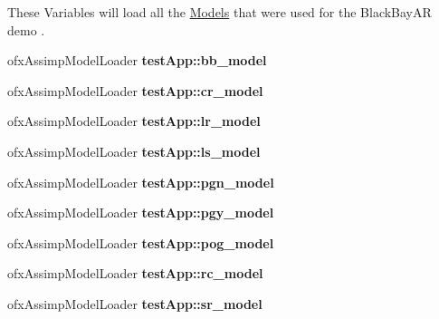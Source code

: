 These Variables will load all the \hyperlink{class_models}{Models} that were used for the Black\-Bay\-A\-R demo . \begin{DoxyCompactItemize}
\item 
\hypertarget{group___int_variables_ga55051db1203331adb5556373b1f93194}{ofx\-Assimp\-Model\-Loader {\bfseries test\-App\-::bb\-\_\-model}}\label{group___int_variables_ga55051db1203331adb5556373b1f93194}

\item 
\hypertarget{group___int_variables_ga0226f29cac900da4a7d1a698b1b5b9d3}{ofx\-Assimp\-Model\-Loader {\bfseries test\-App\-::cr\-\_\-model}}\label{group___int_variables_ga0226f29cac900da4a7d1a698b1b5b9d3}

\item 
\hypertarget{group___int_variables_ga75d1f2c61d9e27b0f639a2632de94ed0}{ofx\-Assimp\-Model\-Loader {\bfseries test\-App\-::lr\-\_\-model}}\label{group___int_variables_ga75d1f2c61d9e27b0f639a2632de94ed0}

\item 
\hypertarget{group___int_variables_gab7fc48fde55ff01601e7ec704685fda7}{ofx\-Assimp\-Model\-Loader {\bfseries test\-App\-::ls\-\_\-model}}\label{group___int_variables_gab7fc48fde55ff01601e7ec704685fda7}

\item 
\hypertarget{group___int_variables_ga80f171a105bccdb3e505d438462d089a}{ofx\-Assimp\-Model\-Loader {\bfseries test\-App\-::pgn\-\_\-model}}\label{group___int_variables_ga80f171a105bccdb3e505d438462d089a}

\item 
\hypertarget{group___int_variables_gaf98c6967c563936d418bf048a7d392b7}{ofx\-Assimp\-Model\-Loader {\bfseries test\-App\-::pgy\-\_\-model}}\label{group___int_variables_gaf98c6967c563936d418bf048a7d392b7}

\item 
\hypertarget{group___int_variables_ga28a2622b1304d4096d4fefc1a46759b3}{ofx\-Assimp\-Model\-Loader {\bfseries test\-App\-::pog\-\_\-model}}\label{group___int_variables_ga28a2622b1304d4096d4fefc1a46759b3}

\item 
\hypertarget{group___int_variables_ga24711bff00befce43455ad79653d388d}{ofx\-Assimp\-Model\-Loader {\bfseries test\-App\-::rc\-\_\-model}}\label{group___int_variables_ga24711bff00befce43455ad79653d388d}

\item 
\hypertarget{group___int_variables_ga74279f23511603111eb4126414556b1b}{ofx\-Assimp\-Model\-Loader {\bfseries test\-App\-::sr\-\_\-model}}\label{group___int_variables_ga74279f23511603111eb4126414556b1b}


\end{DoxyCompactItemize}
